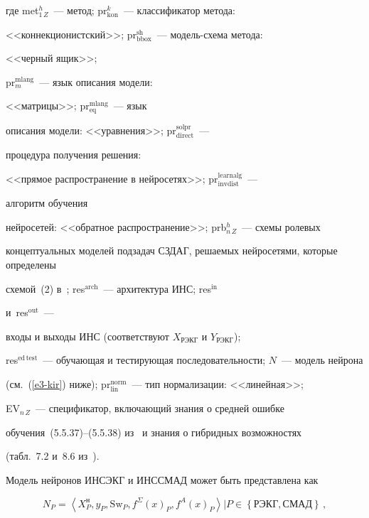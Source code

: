  где met$^h_{1\,Z}$~--- метод; pr$_{\mathrm{kon}}^k$~--- классификатор метода:


<<коннекционистский>>; pr$^{\mathrm{sh}}_{\mathrm{bbox}}$~--- мо\-дель-схе\-ма метода:


<<черный ящик>>;


pr$_m^{\mathrm{mlang}}$~--- язык описания модели:


<<матрицы>>; pr$_{\mathrm{eq}}^{\mathrm{mlang}}$~--- язык


описания модели: <<уравнения>>; pr$_{\mathrm{direct}}^{\mathrm{solpr}}$~---


процедура получения решения:


<<прямое распространение в нейросетях>>; pr$_{\mathrm{invdist}}^{\mathrm{learnalg}}$~---


алгоритм обучения


нейросетей: <<обратное распространение>>; prb$^h_{n\,Z}$~--- схемы ролевых


концептуальных моделей подзадач СЗДАГ, ре\-ша\-емых нейросетями, которые определены


схемой~(2) в~\cite{4-kir}; res$^{\mathrm{arch}}$~--- архитектура ИНС; res$^{\mathrm{in}}$


и~res$^{\mathrm{out}}$~---


входы и выходы ИНС (соответствуют $X_{\mathrm{РЭКГ}}$ и $Y_{\mathrm{РЭКГ}}$);


res$^{\mathrm{ed\,test}}$~--- обуча\-ющая и тестирующая последовательности; $N$~--- модель нейрона


(см.~(\ref{e3-kir}) ниже); pr$_{\mathrm{lin}}^{\mathrm{norm}}$~--- тип нормализации: <<линейная>>;


EV$_{n\,Z}$~--- спецификатор, включающий знания о средней ошибке


обучения~(5.5.37)--(5.5.38) из~\cite{9-kir} и знания о гибридных возможностях 


(табл.~7.2 и~8.6 из~\cite{9-kir}).





 Модель нейронов ИНСЭКГ и ИНССМАД может быть представлена как


 \begin{equation}


 N_P= \left\langle X^{\mathrm{н}}_P, y_P, \mathrm{Sw}_P, f^\Sigma(x)_P, {f^A(x)}_P\right\rangle \big\vert


P\in \left\{ \mathrm{РЭКГ, СМАД} \right\}\,,


 \label{e3-kir}


 \end{equation}


